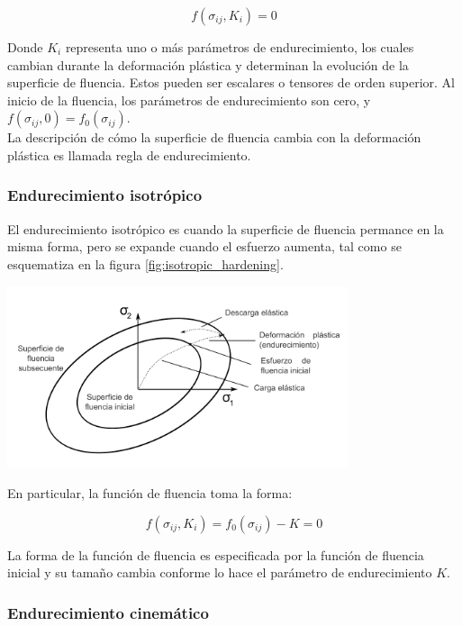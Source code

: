 \begin{equation}
f(\sigma_{ij}, K_i) = 0
\end{equation}

Donde $K_i$ representa uno o más parámetros de endurecimiento, los cuales cambian durante la 
deformación plástica y determinan la evolución de la superficie de fluencia. Estos pueden 
ser escalares o tensores de orden superior. Al inicio de la fluencia, los parámetros de 
endurecimiento son cero, y $f(\sigma_{ij}, 0) = f_0(\sigma_{ij}) $. \\

La descripción de cómo la superficie de fluencia cambia con la deformación plástica es 
llamada regla de endurecimiento. 

\subsubsection{Endurecimiento isotrópico}

El endurecimiento isotrópico es cuando la superficie de fluencia permance en la misma forma, 
pero se expande cuando el esfuerzo aumenta, tal como se esquematiza en la figura \ref{fig:isotropic_hardening}.

\begin{center}
\includegraphics[width=0.75\textwidth]{src/ch2/isotropic_hardening}
\label{fig:isotropic_hardening}
\end{center}

En particular, la función de fluencia toma la forma:

\begin{equation}
f(\sigma_{ij}, K_i) = f_0 ( \sigma_{ij} ) - K = 0
\end{equation}

La forma de la función de fluencia es especificada por la función de fluencia inicial y su 
tamaño cambia conforme lo hace el parámetro de endurecimiento $K$.


\subsubsection{Endurecimiento cinemático}


